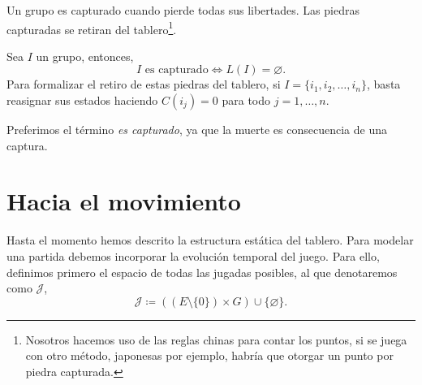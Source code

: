 Un grupo es capturado cuando pierde todas sus libertades. Las piedras capturadas se retiran del tablero\footnote{Nosotros hacemos uso de las reglas chinas para contar los puntos, si se juega con otro método, japonesas por ejemplo, habría que otorgar un punto por piedra capturada.}.

\begin{definition}
	Sea $I$ un grupo, entonces,
	\[I \text{ es capturado} \iff L(I) = \varnothing.\]
	Para formalizar el retiro de estas piedras del tablero, si $I = \{i_1, i_2, \dots, i_n\}$, basta reasignar sus estados haciendo $C(i_j) = 0$ para todo $j=1, \dots, n$.
\end{definition}
Preferimos el término \textit{es capturado}, ya que la muerte es consecuencia de una captura.

\section{Hacia el movimiento}

Hasta el momento hemos descrito la estructura estática del tablero. Para modelar una partida debemos incorporar la evolución temporal del juego. Para ello, definimos primero el espacio de todas las jugadas posibles, al que denotaremos como $\mathcal{J}$,
$$ \mathcal{J} \coloneqq \left((E \setminus \{0\}) \times G\right) \cup \{\varnothing\}.$$

